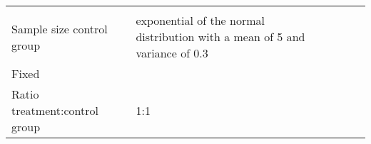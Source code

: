 \documentclass[english,doc,floatsintext]{apa6}
\begin{document}
\begin{longtable}[]{@{}lllll@{}}
\begin{minipage}[t]{0.26\columnwidth}
\end{minipage} & \begin{minipage}[t]{0.04\columnwidth}\raggedright
\strut
\end{minipage} & \begin{minipage}[t]{0.01\columnwidth}\raggedright
\strut
\end{minipage}\tabularnewline
\begin{minipage}[t]{0.20\columnwidth}\raggedright
Sample size control group\strut
\end{minipage} & \begin{minipage}[t]{0.35\columnwidth}\raggedright
exponential of the normal distribution with a mean of 5 and variance of 0.3\strut
\end{minipage} & \begin{minipage}[t]{0.26\columnwidth}\raggedright
\strut
\end{minipage} & \begin{minipage}[t]{0.04\columnwidth}\raggedright
\strut
\end{minipage} & \begin{minipage}[t]{0.01\columnwidth}\raggedright
\strut
\end{minipage}\tabularnewline
\begin{minipage}[t]{0.20\columnwidth}\raggedright
Fixed\strut
\end{minipage} & \begin{minipage}[t]{0.35\columnwidth}\raggedright
\strut
\end{minipage} & \begin{minipage}[t]{0.26\columnwidth}\raggedright
\strut
\end{minipage} & \begin{minipage}[t]{0.04\columnwidth}\raggedright
\strut
\end{minipage} & \begin{minipage}[t]{0.01\columnwidth}\raggedright
\strut
\end{minipage}\tabularnewline
\begin{minipage}[t]{0.20\columnwidth}\raggedright
Ratio treatment:control group\strut
\end{minipage} & \begin{minipage}[t]{0.35\columnwidth}\raggedright
1:1\strut
\end{minipage} & \begin{minipage}[t]{0.26\columnwidth}\raggedright
\strut
\end{minipage} & \begin{minipage}[t]{0.04\columnwidth}\raggedright

\end{minipage}
\end{longtable}
\end{document}

